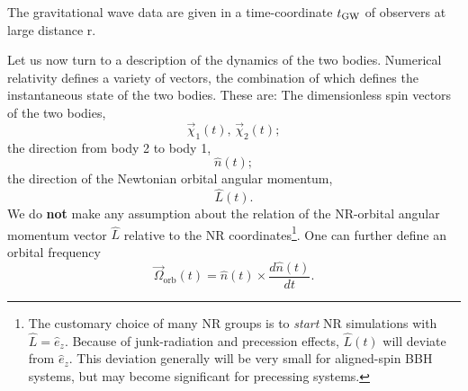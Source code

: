 \documentclass[11pt,tightenlines,article,amssymb,amsmath,amsfonts,superscriptaddress,nofootinbib]{revtex4}
\newcommand{\EzNR}{\hat e_z}
\newcommand{\nNR}{\hat{n}}
\newcommand{\lNR}{\hat L}
\newcommand{\tGW}{t_{\rm GW}}
\begin{document}
The gravitational wave data are given in a time-coordinate $\tGW$ of
observers at large distance r.

Let us now turn to a description of the dynamics of the two bodies.
Numerical relativity defines a variety of vectors, the combination of
which defines the instantaneous state of the two bodies.  These are:
The dimensionless spin vectors of the two bodies,
\begin{equation}\label{eq:chi}
  \vec\chi_1(t),\, \vec\chi_2(t);
\end{equation}
the direction from body 2 to body 1,
\begin{equation}
  \nNR(t);
\end{equation}
the direction of the Newtonian orbital angular momentum,
\begin{equation}
  \hat L(t).
\end{equation}
We do {\bf not} make any assumption about the relation of the
NR-orbital angular momentum vector $\lNR$ relative to the NR
coordinates\footnote{The customary choice of many NR groups is to
  \emph{start} NR simulations with $\lNR=\EzNR$.  Because of
  junk-radiation and precession effects, $\lNR(t)$ will deviate from
  $\EzNR$.  This deviation generally will be very small for
  aligned-spin BBH systems, but may become significant for precessing
  systems.}.
One can further define an orbital frequency
\begin{equation}\label{eq:Omega}
  \vec\Omega_\mathrm{orb}(t) = \nNR(t) \times \frac{d\nNR(t)}{dt}.
\end{equation}
\end{document}
